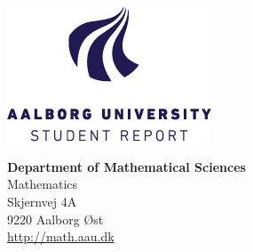 

{}
\thispagestyle{empty}

\begin{minipage}[t]{0.48\textwidth}
\vspace*{-25pt}			%
\includegraphics[height=4cm]{Formalia/AAU-logo-stud-ENG.png}
\end{minipage}
\hfill
\begin{minipage}[t]{0.48\textwidth}
{\small 
\textbf{Department of Mathematical Sciences}\\
Mathematics\\
Skjernvej 4A \\
9220 Aalborg Øst \\
\href{http://math.aau.dk}{http://math.aau.dk}}
\end{minipage}

\vspace*{1cm}


